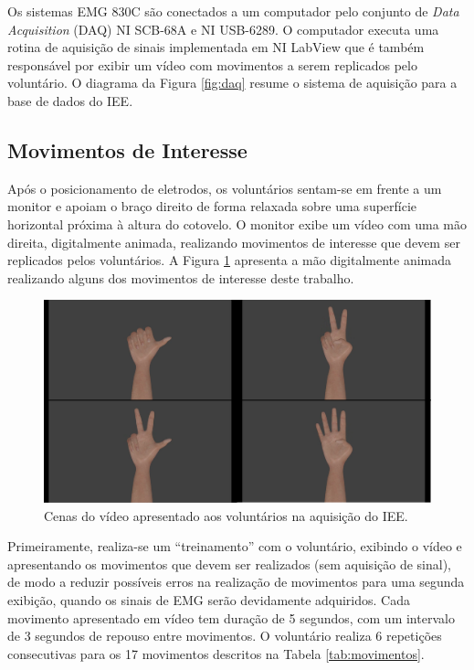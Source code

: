 Os sistemas EMG 830C são conectados a um computador pelo conjunto de \emph{Data Acquisition} (DAQ) NI SCB-68A e NI USB-6289. O computador executa uma rotina de aquisição de sinais implementada em NI LabView que é também responsável por exibir um vídeo com movimentos a serem replicados pelo voluntário. O diagrama da Figura \ref{fig:daq} resume o sistema de aquisição para a base de dados do IEE.



			\subsection{Movimentos de Interesse}
Após o posicionamento de eletrodos, os voluntários sentam-se em frente a um monitor e apoiam o braço direito de forma relaxada sobre uma superfície horizontal próxima à altura do cotovelo. O monitor exibe um vídeo com uma mão direita, digitalmente animada, realizando movimentos de interesse que devem ser replicados pelos voluntários. A Figura \ref{fig:video} apresenta a mão digitalmente animada realizando alguns dos movimentos de interesse deste trabalho.

\begin{figure}[htb]
	\caption{\label{fig:video}Cenas do vídeo apresentado aos voluntários na aquisição do IEE.}
	\begin{center}
	    \includegraphics[width=0.75\linewidth]{./img/scenes.png}
	\end{center}
\end{figure}

Primeiramente, realiza-se um ``treinamento'' com o voluntário, exibindo o vídeo e apresentando os movimentos que devem ser realizados (sem aquisição de sinal), de modo a reduzir possíveis erros na realização de movimentos para uma segunda exibição, quando os sinais de EMG serão devidamente adquiridos. Cada movimento apresentado em vídeo tem duração de 5 segundos, com um intervalo de 3 segundos de repouso entre movimentos. O voluntário realiza 6 repetições consecutivas para os 17 movimentos descritos na Tabela \ref{tab:movimentos}.

